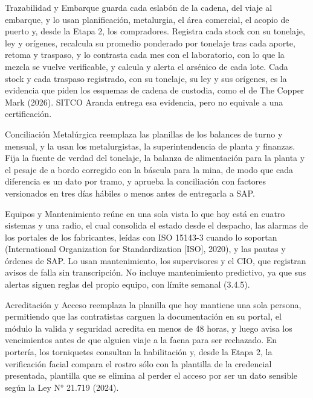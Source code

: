 \documentclass[subdoc]{../../comun/overfore}
\begin{document}
Trazabilidad y Embarque guarda cada eslabón de la cadena, del viaje al embarque, y lo usan planificación, metalurgia, el área comercial, el acopio de puerto y, desde la Etapa 2, los compradores. Registra cada stock con su tonelaje, ley y orígenes, recalcula su promedio ponderado por tonelaje tras cada aporte, retoma y traspaso, y lo contrasta cada mes con el laboratorio, con lo que la mezcla se vuelve verificable, y calcula y alerta el arsénico de cada lote. Cada stock y cada traspaso registrado, con su tonelaje, su ley y sus orígenes, es la evidencia que piden los esquemas de cadena de custodia, como el de The Copper Mark (2026). SITCO Aranda entrega esa evidencia, pero no equivale a una certificación.

Conciliación Metalúrgica reemplaza las planillas de los balances de turno y mensual, y la usan los metalurgistas, la superintendencia de planta y finanzas. Fija la fuente de verdad del tonelaje, la balanza de alimentación para la planta y el pesaje de a bordo corregido con la báscula para la mina, de modo que cada diferencia es un dato por tramo, y aprueba la conciliación con factores versionados en tres días hábiles o menos antes de entregarla a SAP.

Equipos y Mantenimiento reúne en una sola vista lo que hoy está en cuatro sistemas y una radio, el cual consolida el estado desde el despacho, las alarmas de los portales de los fabricantes, leídas con ISO 15143-3 cuando lo soportan (International Organization for Standardization [ISO], 2020), y las pautas y órdenes de SAP. Lo usan mantenimiento, los supervisores y el CIO, que registran avisos de falla sin transcripción. No incluye mantenimiento predictivo, ya que sus alertas siguen reglas del propio equipo, con límite semanal (3.4.5).

Acreditación y Acceso reemplaza la planilla que hoy mantiene una sola persona, permitiendo que las contratistas carguen la documentación en su portal, el módulo la valida y seguridad acredita en menos de 48 horas, y luego avisa los vencimientos antes de que alguien viaje a la faena para ser rechazado. En portería, los torniquetes consultan la habilitación y, desde la Etapa 2, la verificación facial compara el rostro sólo con la plantilla de la credencial presentada, plantilla que se elimina al perder el acceso por ser un dato sensible según la Ley N° 21.719 (2024).
\end{document}
